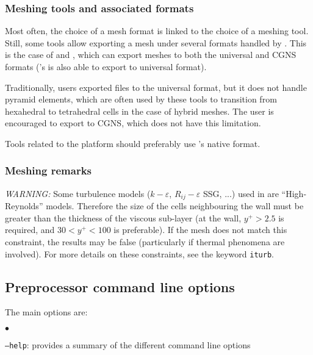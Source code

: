 {{{{%
\subsubsection{Meshing tools and associated formats}

Most often, the choice of a mesh format is linked to the choice of
a meshing tool. Still, some tools allow exporting a mesh under several
formats handled by \CS. This is the case of \fluent and \icemcfd,
which can export meshes to both the \ideas universal and CGNS formats
(\fluent's \gambit is also able to export to \ideas universal format).

Traditionally, users exported files to the \ideas universal format,
but it does not handle pyramid elements, which are often used by these
tools to transition from hexahedral to tetrahedral cells in the case
of hybrid meshes. The user is encouraged to export to CGNS, which
does not have this limitation.

Tools related to the \salome platform should preferably use
\salome{}'s native \med format.

\subsubsection{Meshing remarks}
\label{sec:prg_meshes}%

{\em WARNING: }
Some turbulence models ($k-\varepsilon$, $R_{ij}-\varepsilon$ SSG, ...) used in
\CS are ``High-Reynolds'' models. Therefore the size of the cells
neighbouring the wall must be greater than the thickness of the viscous
sub-layer (at the wall, $y^+>2.5$ is required, and $30<y^+<100$ is
preferable). If the mesh does not match this constraint, the results may
be false (particularly if thermal phenomena are involved). For more details
on these constraints, see the keyword \texttt{iturb}.

\subsection{Preprocessor command line options}
\label{sec:prg_optappelecs}%
The main options are:
\begin{list}{$\bullet$}{}
\item \texttt{--help}: provides a summary of the different command line options


\end{list}}}}}
